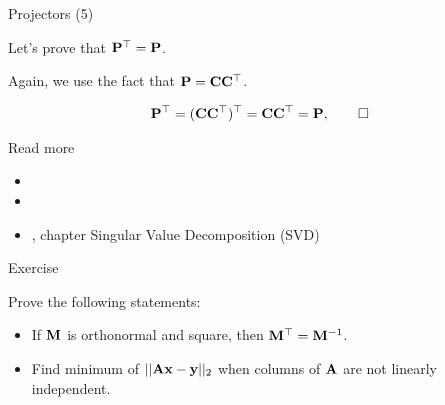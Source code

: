 \documentclass{beamer}
\begin{document}
\begin{frame}{Projectors (5)}
	\begin{flushleft}
		
		Let's prove that $\mathbf{P}^\top = \mathbf{P}$. 
		
		Again, we use the fact that $\mathbf{P} = \mathbf{C}\mathbf{C}^\top$.
		
		\begin{align}
			\mathbf{P}^\top = (\mathbf{C}\mathbf{C}^\top)^\top=\mathbf{C}\mathbf{C}^\top=\mathbf{P}, \qed
		\end{align}
		
		
	\end{flushleft}
\end{frame}





\begin{frame}{Read more}
	\begin{flushleft}
		
		\begin{itemize}
			\item {}
			
			\item {}
			
			\item {}, chapter Singular Value Decomposition (SVD)
			
		\end{itemize}
		
		
	\end{flushleft}
\end{frame}




\begin{frame}{Exercise}
	\begin{flushleft}
		
		Prove the following statements:
		
		\begin{itemize}
			\item If $\mathbf{M}$ is orthonormal and square, then $\mathbf{M}^\top = \mathbf{M}^{-1}$.
			
			\item Find minimum of $||\mathbf{A}\mathbf{x} - \mathbf{y}||_2$ when columns of $\mathbf{A}$ are not linearly independent.
		\end{itemize}
		
		
		
	\end{flushleft}
\end{frame}
\end{document}
